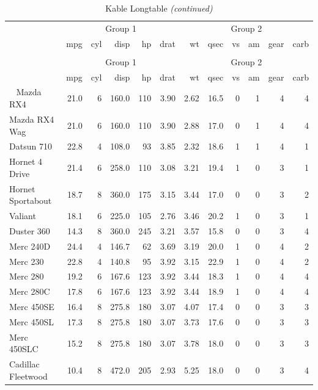 \documentclass[]{book}
\theoremstyle{definition}
\theoremstyle{definition}
\theoremstyle{definition}
\theoremstyle{remark}
\begin{document}
\begin{longtable}[t]{lrrrrrrrrrrr}
\caption{\label{tab:kable2}Kable Longtable}\\
\toprule
\multicolumn{1}{c}{ } & \multicolumn{5}{c}{Group 1} & \multicolumn{6}{c}{Group 2} \\
\cmidrule(l{2pt}r{2pt}){2-6} \cmidrule(l{2pt}r{2pt}){7-12}
  & mpg & cyl & disp & hp & drat & wt & qsec & vs & am & gear & carb\\
\midrule
\endfirsthead
\caption[]{\label{tab:kable2}Kable Longtable \textit{(continued)}}\\
\toprule
\multicolumn{1}{c}{ } & \multicolumn{5}{c}{Group 1} & \multicolumn{6}{c}{Group 2} \\
\cmidrule(l{2pt}r{2pt}){2-6} \cmidrule(l{2pt}r{2pt}){7-12}
  & mpg & cyl & disp & hp & drat & wt & qsec & vs & am & gear & carb\\
\midrule
\endhead
\
\endfoot
\bottomrule
\endlastfoot
Mazda RX4 & 21.0 & 6 & 160.0 & 110 & 3.90 & 2.62 & 16.5 & 0 & 1 & 4 & 4\\
Mazda RX4 Wag & 21.0 & 6 & 160.0 & 110 & 3.90 & 2.88 & 17.0 & 0 & 1 & 4 & 4\\
Datsun 710 & 22.8 & 4 & 108.0 & 93 & 3.85 & 2.32 & 18.6 & 1 & 1 & 4 & 1\\
Hornet 4 Drive & 21.4 & 6 & 258.0 & 110 & 3.08 & 3.21 & 19.4 & 1 & 0 & 3 & 1\\
Hornet Sportabout & 18.7 & 8 & 360.0 & 175 & 3.15 & 3.44 & 17.0 & 0 & 0 & 3 & 2\\
\addlinespace
Valiant & 18.1 & 6 & 225.0 & 105 & 2.76 & 3.46 & 20.2 & 1 & 0 & 3 & 1\\
Duster 360 & 14.3 & 8 & 360.0 & 245 & 3.21 & 3.57 & 15.8 & 0 & 0 & 3 & 4\\
Merc 240D & 24.4 & 4 & 146.7 & 62 & 3.69 & 3.19 & 20.0 & 1 & 0 & 4 & 2\\
Merc 230 & 22.8 & 4 & 140.8 & 95 & 3.92 & 3.15 & 22.9 & 1 & 0 & 4 & 2\\
Merc 280 & 19.2 & 6 & 167.6 & 123 & 3.92 & 3.44 & 18.3 & 1 & 0 & 4 & 4\\
\addlinespace
Merc 280C & 17.8 & 6 & 167.6 & 123 & 3.92 & 3.44 & 18.9 & 1 & 0 & 4 & 4\\
Merc 450SE & 16.4 & 8 & 275.8 & 180 & 3.07 & 4.07 & 17.4 & 0 & 0 & 3 & 3\\
Merc 450SL & 17.3 & 8 & 275.8 & 180 & 3.07 & 3.73 & 17.6 & 0 & 0 & 3 & 3\\
Merc 450SLC & 15.2 & 8 & 275.8 & 180 & 3.07 & 3.78 & 18.0 & 0 & 0 & 3 & 3\\
Cadillac Fleetwood & 10.4 & 8 & 472.0 & 205 & 2.93 & 5.25 & 18.0 & 0 & 0 & 3 & 4\\

\end{longtable}
\end{document}
